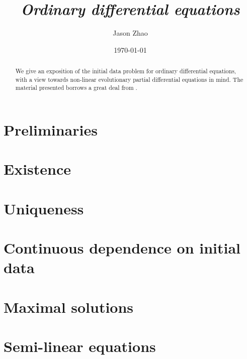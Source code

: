 \documentclass[reqno]{amsart}
\title
{
	\emph{Ordinary differential equations}
}
\author{Jason Zhao}
\date{\today}
\begin{document}
\maketitle

\begin{abstract}
	We give an exposition of the initial data problem for ordinary differential equations, with a view towards non-linear evolutionary partial differential equations in mind. The material presented borrows a great deal from \cite[Chapter 1]{Tao2006}. 
\end{abstract}

\tableofcontents

\section{Preliminaries}


\section{Existence}


\section{Uniqueness}


\section{Continuous dependence on initial data}


\section{Maximal solutions}


\section{Semi-linear equations}




\end{document}
